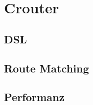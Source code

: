 \section{Crouter}
\label{sec:b-crouter}

\subsection{DSL}
\label{ssec:br-dsl}

\subsection{Route Matching}
\label{ssec:br-route-matching}

\subsection{Performanz}
\label{ssec:br-performanz}
